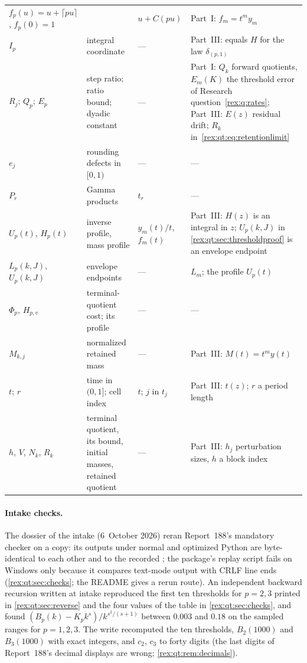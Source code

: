 {\begin{longtable}{@{}>{\raggedright\arraybackslash}p{}>{\raggedright\arraybackslash}p{}>{\raggedright\arraybackslash}p{}>{\raggedright\arraybackslash}p{}@{}}
$f_p(u)=u+\lceil pu\rceil$, $f_p(0)=1$ & & $u+C(pu)$ & Part~I: $f_m=t^my_m$\\
$I_p$ & integral coordinate & --- & Part~III: equals $H$ for the law $\delta_{(p,1)}$\\
$R_j$; $Q_p$; $E_p$ & step ratio; ratio bound; dyadic constant & --- & Part~I: $Q_k$ forward quotients, $E_m(K)$ the threshold error of Research question~\ref{rex:q:rates}; Part~III: $E(z)$ residual drift; $R_k$ in~\eqref{rex:qt:eq:retentionlimit}\\
$e_j$ & rounding defects in $[0,1)$ & --- & ---\\
$P_r$ & Gamma products & $t_r$ & ---\\
$U_p(t)$, $H_p(t)$ & inverse profile, mass profile & $y_m(t)/t$, $f_m(t)$ & Part~III: $H(z)$ is an integral in $z$; $U_p(k,J)$ in \cref{rex:qt:sec:thresholdproof} is an envelope endpoint\\
$L_p(k,J)$, $U_p(k,J)$ & envelope endpoints & --- & $L_m$; the profile $U_p(t)$\\
$\Phi_p$, $H_{p,v}$ & terminal-quotient cost; its profile & --- & ---\\
$M_{k,j}$ & normalized retained mass & --- & Part~III: $M(t)=t^my(t)$\\
$t$; $r$ & time in $(0,1]$; cell index & $t$; $j$ in $t_j$ & Part~III: $t(z)$; $r$ a period length\\
$h$, $V$, $N_k$, $R_k$ & terminal quotient, its bound, initial masses, retained quotient & --- & Part~III: $h_j$ perturbation sizes, $h$ a block index\\
\end{longtable}
}

\paragraph{Intake checks.} The dossier of the intake (6~October 2026)
reran Report~188's mandatory checker on a copy: its outputs under normal
and optimized Python are byte-identical to each other and to the recorded
; the package's replay
script fails on Windows only because it compares text-mode output with
CRLF line ends (\cref{rex:qt:sec:checks}; the README gives a rerun route).
An independent backward recursion written at intake reproduced the first
ten thresholds for $p=2,3$ printed in \cref{rex:qt:sec:reverse} and the
four values of the table in \cref{rex:qt:sec:checks}, and found
$(B_p(k)-K_pk^s)/k^{s^2/(s+1)}$ between $0.003$ and $0.18$ on the sampled
ranges for $p=1,2,3$. The write recomputed the ten thresholds, $B_2(1000)$
and $B_3(1000)$ with exact integers, and $c_2$, $c_3$ to forty digits
(the last digits of Report~188's decimal displays are wrong;
\cref{rex:qt:rem:decimals}).

